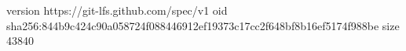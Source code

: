 version https://git-lfs.github.com/spec/v1
oid sha256:844b9c424c90a058724f088446912ef19373c17cc2f648bf8b16ef5174f988be
size 43840
